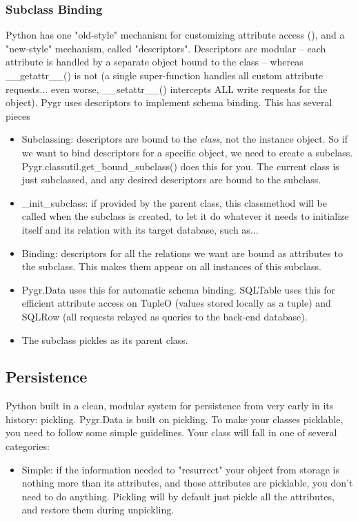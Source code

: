 \documentclass{howto}
\begin{document}
\begin{itemize}
\subsubsection{Subclass Binding}
Python has one "old-style" mechanism for customizing attribute access
(), and a "new-style" mechanism, called "descriptors".
Descriptors are modular -- each attribute is handled by a separate object
bound to the class -- whereas __getattr__() is not (a single super-function
handles all custom attribute requests... even worse, __setattr__() intercepts
ALL write requests for the object).  Pygr uses descriptors to implement
schema binding.  This has several pieces
\begin{itemize}
\item Subclassing: descriptors are bound to the {\em class}, not the instance
object.  So if we want to bind descriptors for a specific object, we need to 
create a subclass.  Pygr.classutil.get_bound_subclass() does this for you.
The current class is just subclassed, and any desired descriptors are bound
to the subclass.
\item _init_subclass: if provided by the parent class, this classmethod will be called when
the subclass is created, to let it do whatever it needs to initialize itself
and its relation with its target database, such as...
\item Binding: descriptors for all the relations we want are bound as
attributes to the subclass.  This makes them appear on all instances of this
subclass.
\item Pygr.Data uses this for automatic schema binding.  SQLTable uses this 
for efficient attribute access on TupleO (values stored locally as a tuple)
and SQLRow (all requests relayed as queries to the back-end database).
\item The subclass pickles as its parent class.
\end{itemize}

\subsection{Persistence}
Python built in a clean, modular system for persistence from very early in its
history: pickling.  Pygr.Data is built on pickling.  To make your classes
picklable, you need to follow some simple guidelines.  Your class will fall
in one of several categories:
\begin{itemize}
\item Simple: if the information needed to "resurrect" your object from storage
is nothing more than its attributes, and those attributes are picklable, you
don't need to do anything.  Pickling will by default just pickle all the 
attributes, and restore them during unpickling.


\end{itemize}
\end{itemize}
\end{document}

